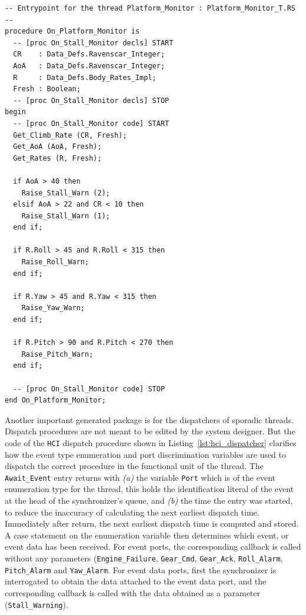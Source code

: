 \begin{minipage}{\listingwidth}
\lstset{language=ada}
\begin{lstlisting}[label=lst:platform_monitor,caption=Procedure called
    when \texttt{Platform\_Monitor} is dispatched.]
-- Entrypoint for the thread Platform_Monitor : Platform_Monitor_T.RS --
procedure On_Platform_Monitor is
  -- [proc On_Stall_Monitor decls] START
  CR    : Data_Defs.Ravenscar_Integer;
  AoA   : Data_Defs.Ravenscar_Integer;
  R     : Data_Defs.Body_Rates_Impl;
  Fresh : Boolean;
  -- [proc On_Stall_Monitor decls] STOP
begin
  -- [proc On_Stall_Monitor code] START
  Get_Climb_Rate (CR, Fresh);
  Get_AoA (AoA, Fresh);
  Get_Rates (R, Fresh);

  if AoA > 40 then
    Raise_Stall_Warn (2);
  elsif AoA > 22 and CR < 10 then
    Raise_Stall_Warn (1);
  end if;

  if R.Roll > 45 and R.Roll < 315 then
    Raise_Roll_Warn;
  end if;

  if R.Yaw > 45 and R.Yaw < 315 then
    Raise_Yaw_Warn;
  end if;

  if R.Pitch > 90 and R.Pitch < 270 then
    Raise_Pitch_Warn;
  end if;

  -- [proc On_Stall_Monitor code] STOP
end On_Platform_Monitor;
\end{lstlisting}
\end{minipage}

Another important generated package is for the dispatchers of sporadic
threads. Dispatch procedures are not meant to be edited by the system
designer. But the code of the \texttt{HCI} dispatch procedure shown in
Listing~\ref{lst:hci_dispatcher} clarifies how the event type
enumeration and port discrimination variables are used to dispatch the
correct procedure in the functional unit of the thread. The
\texttt{Await\_Event} entry returns with \emph{(a)} the variable
\texttt{Port} which is of the event enumeration type for the thread,
this holds the identification literal of the event at the head of the
synchronizer's queue, and \emph{(b)} the time the entry was started,
to reduce the inaccuracy of calculating the next earliest dispatch
time. Immediately after return, the next earliest dispatch time is
computed and stored. A case statement on the enumeration variable then
determines which event, or event data has been received. For event
ports, the corresponding callback is called without any parameters
(\texttt{Engine\_Failure}, \texttt{Gear\_Cmd}, \texttt{Gear\_Ack},
\texttt{Roll\_Alarm}, \texttt{Pitch\_Alarm} and
\texttt{Yaw\_Alarm}. For event data ports, first the synchronizer is
interrogated to obtain the data attached to the event data port, and
the corresponding callback is called with the data obtained as a
parameter (\texttt{Stall\_Warning}).

